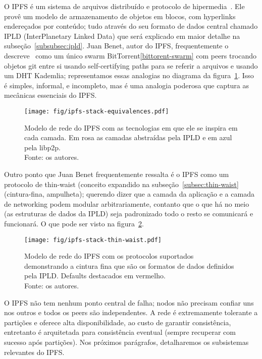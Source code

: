 O IPFS é um sistema de arquivos distribuído e protocolo de hipermedia~\cite{benet2014ipfs}.
Ele provê um modelo de armazenamento de objetos em blocos, com hyperlinks endereçados por conteúdo; tudo através do seu formato de dados central chamado IPLD (InterPlanetary Linked Data) que será explicado em maior detalhe na subseção~\ref{subsubsec:ipld}.
Juan Benet, autor do IPFS, frequentemente o descreve~\cite{github:ipfs} como um único swarm BitTorrent\ref{bittorent-swarm} com peers trocando objetos git entre si usando self-certifying paths para se referir a arquivos e usando um DHT Kademlia; representamos essas analogias no diagrama da figura~\ref{fig:ipfs-stack-equivalences}.
Isso é simples, informal, e incompleto, mas é uma analogia poderosa que captura as mecânicas essenciais do IPFS.

\begin{figure}[htb]
    \centering
    \texttt{[image: fig/ipfs-stack-equivalences.pdf]}
    \caption[IPFS stack equivalences]{
        Modelo de rede do IPFS com as tecnologias em que ele se inspira em cada camada. Em rosa as camadas abstraídas pela IPLD e em azul pela libp2p.\\
        Fonte: os autores.
    }
    \label{fig:ipfs-stack-equivalences}
\end{figure}

Outro ponto que Juan Benet frequentemente ressalta é o IPFS como um protocolo de thin-waist (conceito expandido na subseção~\ref{subsec:thin-waist} (cintura-fina, ampulheta);
querendo dizer que a camada da aplicação e a camada de networking podem modular arbitrariamente, contanto que o que há no meio (as estruturas de dados da IPLD) seja padronizado todo o resto se comunicará e funcionará.
O que pode ser visto na figura~\ref{fig:ipfs-stack-thin-waist}.

\begin{figure}[htb]
    \centering
    \texttt{[image: fig/ipfs-stack-thin-waist.pdf]}
    \caption[IPFS's hourglass network stack]{
        Modelo de rede do IPFS com os protocolos suportados demonstrando a cintura fina que são os formatos de dados definidos pela IPLD. Defaults destacados em vermelho.\\
        Fonte: os autores.
    }
    \label{fig:ipfs-stack-thin-waist}
\end{figure}

O IPFS não tem nenhum ponto central de falha; nodos não precisam confiar uns nos outros e todos os peers são independentes.
A rede é extremamente tolerante a partições e oferece alta disponibilidade, ao custo de garantir consistência, entretanto é arquitetada para consistência eventual (sempre recuperar com sucesso após partições).
Nos próximos parágrafos, detalharemos os subsistemas relevantes do IPFS.

